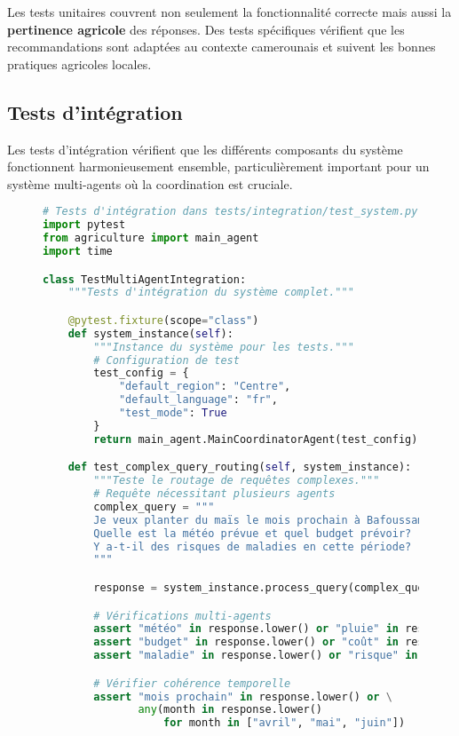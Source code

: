 Les tests unitaires couvrent non seulement la fonctionnalité correcte mais aussi la \textbf{pertinence agricole} des réponses. Des tests spécifiques vérifient que les recommandations sont adaptées au contexte camerounais et suivent les bonnes pratiques agricoles locales.

\subsection{Tests d'intégration}

Les tests d'intégration vérifient que les différents composants du système fonctionnent harmonieusement ensemble, particulièrement important pour un système multi-agents où la coordination est cruciale.

\begin{figure}[h]
\centering
\begin{lstlisting}[language=Python, caption=Suite de tests d'intégration]
# Tests d'intégration dans tests/integration/test_system.py
import pytest
from agriculture import main_agent
import time

class TestMultiAgentIntegration:
    """Tests d'intégration du système complet."""

    @pytest.fixture(scope="class")
    def system_instance(self):
        """Instance du système pour les tests."""
        # Configuration de test
        test_config = {
            "default_region": "Centre",
            "default_language": "fr",
            "test_mode": True
        }
        return main_agent.MainCoordinatorAgent(test_config)

    def test_complex_query_routing(self, system_instance):
        """Teste le routage de requêtes complexes."""
        # Requête nécessitant plusieurs agents
        complex_query = """
        Je veux planter du maïs le mois prochain à Bafoussam.
        Quelle est la météo prévue et quel budget prévoir?
        Y a-t-il des risques de maladies en cette période?
        """

        response = system_instance.process_query(complex_query)

        # Vérifications multi-agents
        assert "météo" in response.lower() or "pluie" in response.lower()
        assert "budget" in response.lower() or "coût" in response.lower()
        assert "maladie" in response.lower() or "risque" in response.lower()

        # Vérifier cohérence temporelle
        assert "mois prochain" in response.lower() or \
               any(month in response.lower()
                   for month in ["avril", "mai", "juin"])


\end{lstlisting}
\end{figure}
